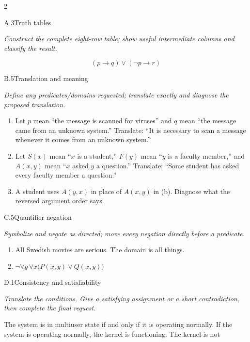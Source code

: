\documentclass[9pt]{extarticle}
\begin{document}
\CoreWorkArea
\FormBreak
{}
\begin{multicols}{2}
\begin{CoreProblem}{A.3}{Truth tables}
{\scriptsize\textit{Construct the complete eight-row table; show useful intermediate columns and classify the result.}\par}
\[
  (p\to q)\lor(\neg p\to r)
\]
\end{CoreProblem}
\begin{CoreProblem}{B.5}{Translation and meaning}
{\scriptsize\textit{Define any predicates/domains requested; translate exactly and diagnose the proposed translation.}\par}
\begin{enumerate}[label=(\alph*)]
  \item Let $p$ mean ``the message is scanned for viruses'' and $q$ mean ``the
        message came from an unknown system.'' Translate: ``It is necessary to
        scan a message whenever it comes from an unknown system.''
  \item Let $S(x)$ mean ``$x$ is a student,'' $F(y)$ mean ``$y$ is a faculty
        member,'' and $A(x,y)$ mean ``$x$ asked $y$ a question.'' Translate:
        ``Some student has asked every faculty member a question.''
  \item A student uses $A(y,x)$ in place of $A(x,y)$ in (b). Diagnose what the
        reversed argument order says.
\end{enumerate}
\end{CoreProblem}
\begin{CoreProblem}{C.5}{Quantifier negation}
{\scriptsize\textit{Symbolize and negate as directed; move every negation directly before a predicate.}\par}
\begin{enumerate}[label=(\alph*)]
  \item All Swedish movies are serious. The domain is all things.
  \item $\neg\forall y\,\forall x\bigl(P(x,y)\lor Q(x,y)\bigr)$
\end{enumerate}
\end{CoreProblem}
\columnbreak
\begin{CoreProblem}{D.1}{Consistency and satisfiability}
{\scriptsize\textit{Translate the conditions. Give a satisfying assignment or a short contradiction, then complete the final request.}\par}
The system is in multiuser state if and only if it is operating normally. If
the system is operating normally, the kernel is functioning. The kernel is not

\end{CoreProblem}
\end{multicols}
\end{document}
